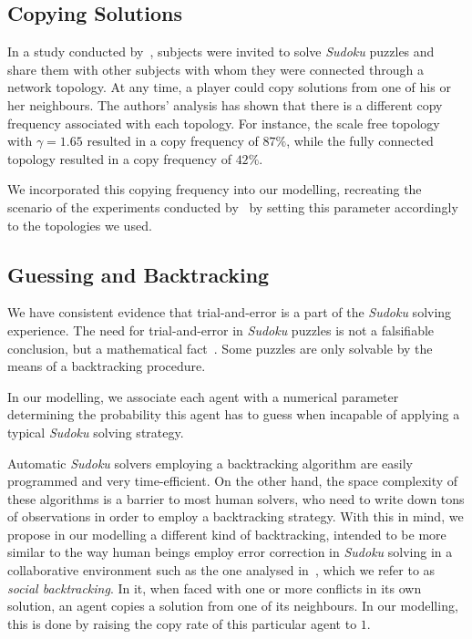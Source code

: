 \documentclass{article}
\begin{document}
\subsection{Copying Solutions}

In a study conducted by~\cite{farenzena:collabem}, subjects were invited to solve {\em Sudoku} puzzles and share them with other subjects with whom they were connected through a network topology. At any time, a player could copy solutions from one of his or her neighbours. The authors' analysis has shown that there is a different copy frequency associated with each topology. For instance, the scale free topology with $\gamma = 1.65$ resulted in a copy frequency of $87 \%$, while the fully connected topology resulted in a copy frequency of $42 \%$.

We incorporated this copying frequency into our modelling, recreating the scenario of the experiments conducted by~\cite{farenzena:collabem} by setting this parameter accordingly to the topologies we used.

\subsection{Guessing and Backtracking}

We have consistent evidence that trial-and-error is a part of the {\em Sudoku} solving experience. The need for trial-and-error in {\em Sudoku} puzzles is not a falsifiable conclusion, but a mathematical fact~\cite{davis:mathsudoku}. Some puzzles are only solvable by the means of a backtracking procedure.

In our modelling, we associate each agent with a numerical parameter determining the probability this agent has to guess when incapable of applying a typical {\em Sudoku} solving strategy.

Automatic {\em Sudoku} solvers employing a backtracking algorithm are easily programmed and very time-efficient. On the other hand, the space complexity of these algorithms is a barrier to most human solvers, who need to write down tons of observations in order to employ a backtracking strategy. With this in mind, we propose in our modelling a different kind of backtracking, intended to be more similar to the way human beings employ error correction in {\em Sudoku} solving in a collaborative environment such as the one analysed in~\cite{farenzena:collabem}, which we refer to as \emph{social backtracking}. In it, when faced with one or more conflicts in its own solution, an agent copies a solution from one of its neighbours. In our modelling, this is done by raising the copy rate of this particular agent to $1$.
\end{document}
